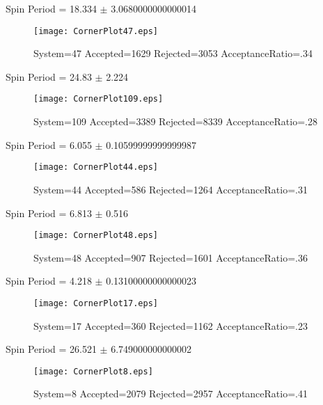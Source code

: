 \documentclass[10pt]{article}
\begin{document}
\newpage
\begin{center}
        Spin Period = 18.334 $\pm$ 3.0680000000000014
        \end{center}
\begin{figure}[h] 
        \texttt{[image: CornerPlot47.eps]}
        \caption{System=47 Accepted=1629 Rejected=3053 AcceptanceRatio=.34}
        \label{S47}
        \centering
        \end{figure}
\newpage
\begin{center}
        Spin Period = 24.83 $\pm$ 2.224
        \end{center}
\begin{figure}[h] 
        \texttt{[image: CornerPlot109.eps]}
        \caption{System=109 Accepted=3389 Rejected=8339 AcceptanceRatio=.28}
        \label{S109}
        \centering
        \end{figure}
\newpage
\begin{center}
        Spin Period = 6.055 $\pm$ 0.10599999999999987
        \end{center}
\begin{figure}[h] 
        \texttt{[image: CornerPlot44.eps]}
        \caption{System=44 Accepted=586 Rejected=1264 AcceptanceRatio=.31}
        \label{S44}
        \centering
        \end{figure}
\newpage
\begin{center}
        Spin Period = 6.813 $\pm$ 0.516
        \end{center}
\begin{figure}[h] 
        \texttt{[image: CornerPlot48.eps]}
        \caption{System=48 Accepted=907 Rejected=1601 AcceptanceRatio=.36}
        \label{S48}
        \centering
        \end{figure}
\newpage
\begin{center}
        Spin Period = 4.218 $\pm$ 0.13100000000000023
        \end{center}
\begin{figure}[h] 
        \texttt{[image: CornerPlot17.eps]}
        \caption{System=17 Accepted=360 Rejected=1162 AcceptanceRatio=.23}
        \label{S17}
        \centering
        \end{figure}
\newpage
\begin{center}
        Spin Period = 26.521 $\pm$ 6.749000000000002
        \end{center}
\begin{figure}[h] 
        \texttt{[image: CornerPlot8.eps]}
        \caption{System=8 Accepted=2079 Rejected=2957 AcceptanceRatio=.41}
        \label{S8}
        \centering
        \end{figure}
\end{document}
